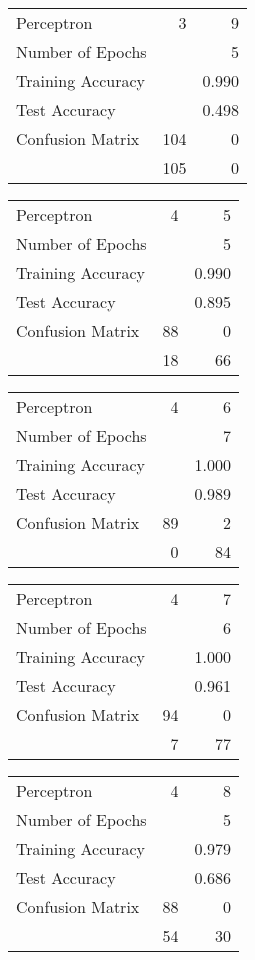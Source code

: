 \documentclass[11pt]{article}
\begin{document}
\begin{minipage}[t]{0.5\textwidth}
\begin{tabular}{|l | r r|}
\hline Perceptron & 3 & 9\\
Number of Epochs & & 5\\
Training Accuracy & & 0.990\\
Test Accuracy & & 0.498\\
Confusion Matrix & 104 & 0\\
 &105 & 0\\ \hline
\end{tabular}
\end{minipage}
\begin{minipage}[t]{0.5\textwidth}
\begin{tabular}{|l | r r|}
\hline Perceptron & 4 & 5\\
Number of Epochs & & 5\\
Training Accuracy & & 0.990\\
Test Accuracy & & 0.895\\
Confusion Matrix & 88 & 0\\
 &18 & 66\\ \hline
\end{tabular}
\end{minipage}
\begin{minipage}[t]{0.5\textwidth}
\begin{tabular}{|l | r r|}
\hline Perceptron & 4 & 6\\
Number of Epochs & & 7\\
Training Accuracy & & 1.000\\
Test Accuracy & & 0.989\\
Confusion Matrix & 89 & 2\\
 &0 & 84\\ \hline
\end{tabular}
\end{minipage}
\begin{minipage}[t]{0.5\textwidth}
\begin{tabular}{|l | r r|}
\hline Perceptron & 4 & 7\\
Number of Epochs & & 6\\
Training Accuracy & & 1.000\\
Test Accuracy & & 0.961\\
Confusion Matrix & 94 & 0\\
 &7 & 77\\ \hline
\end{tabular}
\end{minipage}
\begin{minipage}[t]{0.5\textwidth}
\begin{tabular}{|l | r r|}
\hline Perceptron & 4 & 8\\
Number of Epochs & & 5\\
Training Accuracy & & 0.979\\
Test Accuracy & & 0.686\\
Confusion Matrix & 88 & 0\\
 &54 & 30\\ \hline
\end{tabular}
\end{minipage}
\end{document}
